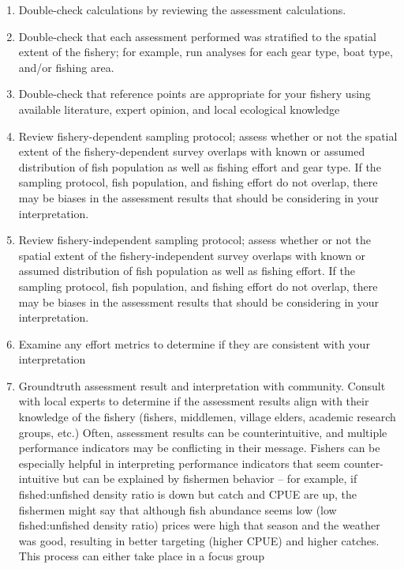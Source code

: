 \documentclass[]{book}
\begin{document}
\begin{enumerate}
\def\labelenumi{\arabic{enumi}.}
\item
  Double-check calculations by reviewing the assessment calculations.
\item
  Double-check that each assessment performed was stratified to the
  spatial extent of the fishery; for example, run analyses for each gear
  type, boat type, and/or fishing area.
\item
  Double-check that reference points are appropriate for your fishery
  using available literature, expert opinion, and local ecological
  knowledge
\item
  Review fishery-dependent sampling protocol; assess whether or not the
  spatial extent of the fishery-dependent survey overlaps with known or
  assumed distribution of fish population as well as fishing effort and
  gear type. If the sampling protocol, fish population, and fishing
  effort do not overlap, there may be biases in the assessment results
  that should be considering in your interpretation.
\item
  Review fishery-independent sampling protocol; assess whether or not
  the spatial extent of the fishery-independent survey overlaps with
  known or assumed distribution of fish population as well as fishing
  effort. If the sampling protocol, fish population, and fishing effort
  do not overlap, there may be biases in the assessment results that
  should be considering in your interpretation.
\item
  Examine any effort metrics to determine if they are consistent with
  your interpretation
\item
  Groundtruth assessment result and interpretation with community.
  Consult with local experts to determine if the assessment results
  align with their knowledge of the fishery (fishers, middlemen, village
  elders, academic research groups, etc.) Often, assessment results can
  be counterintuitive, and multiple performance indicators may be
  conflicting in their message. Fishers can be especially helpful in
  interpreting performance indicators that seem counter-intuitive but
  can be explained by fishermen behavior -- for example, if
  fished:unfished density ratio is down but catch and CPUE are up, the
  fishermen might say that although fish abundance seems low (low
  fished:unfished density ratio) prices were high that season and the
  weather was good, resulting in better targeting (higher CPUE) and
  higher catches. This process can either take place in a focus group

\end{enumerate}
\end{document}

